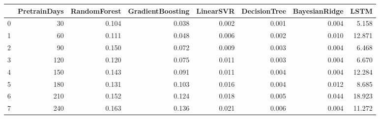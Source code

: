 \begin{tabular}{lrrrrrrr}
\toprule
{} &  PretrainDays &  RandomForest &  GradientBoosting &  LinearSVR &  DecisionTree &  BayesianRidge &   LSTM \\
\midrule
0 &            30 &         0.104 &             0.038 &      0.002 &         0.001 &          0.004 &  5.158 \\
1 &            60 &         0.111 &             0.048 &      0.006 &         0.002 &          0.010 & 12.871 \\
2 &            90 &         0.150 &             0.072 &      0.009 &         0.003 &          0.004 &  6.468 \\
3 &           120 &         0.120 &             0.075 &      0.011 &         0.003 &          0.004 &  6.670 \\
4 &           150 &         0.143 &             0.091 &      0.011 &         0.004 &          0.004 & 12.284 \\
5 &           180 &         0.131 &             0.103 &      0.016 &         0.004 &          0.012 &  8.685 \\
6 &           210 &         0.152 &             0.124 &      0.018 &         0.005 &          0.044 & 18.923 \\
7 &           240 &         0.163 &             0.136 &      0.021 &         0.006 &          0.004 & 11.272 \\
\bottomrule
\end{tabular}
